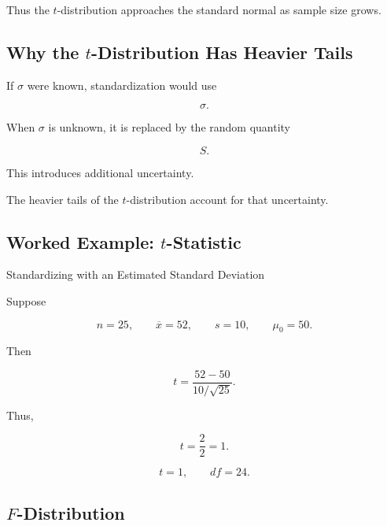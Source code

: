 Thus the \(t\)-distribution approaches the standard normal as sample size
grows.

\subsection{Why the \(t\)-Distribution Has Heavier Tails}
\label{subsec:why-t-heavy-tails}

If \(\sigma\) were known, standardization would use

\[
\sigma.
\]

When \(\sigma\) is unknown, it is replaced by the random quantity

\[
S.
\]

This introduces additional uncertainty.

The heavier tails of the \(t\)-distribution account for that
uncertainty.

\subsection{Worked Example: \(t\)-Statistic}
\label{subsec:worked-t-statistic}

\begin{workedexamplebox}{Standardizing with an Estimated Standard Deviation}

Suppose

\[
n=25,
\qquad
\overline{x}=52,
\qquad
s=10,
\qquad
\mu_0=50.
\]

Then

\[
t
=
\frac{
52-50
}{
10/\sqrt{25}
}.
\]

Thus,

\[
t
=
\frac2{2}
=
1.
\]

\begin{answerbox}
\[
\boxed{
t=1,
\qquad
df=24.
}
\]
\end{answerbox}

\end{workedexamplebox}

\subsection{\(F\)-Distribution}
\label{subsec:f-distribution-sampling}

